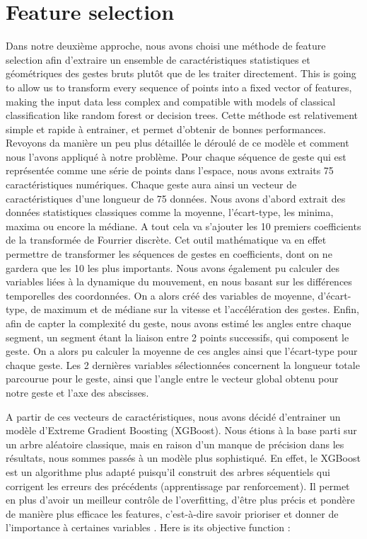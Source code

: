 \documentclass{article}
\begin{document}
\section{Feature selection}
Dans notre deuxième approche, nous avons choisi une méthode de feature selection afin d’extraire un ensemble de caractéristiques statistiques et géométriques des gestes bruts plutôt que de les traiter directement. 
This is going to allow us to transform every sequence of points into a fixed vector of features, making the input data less complex and compatible with models of classical classification like random forest or decision trees. 
Cette méthode est relativement simple et rapide à entrainer, et permet d’obtenir de bonnes performances. Revoyons da manière un peu plus détaillée le déroulé de ce modèle et comment nous l’avons appliqué à notre problème. 
Pour chaque séquence de geste qui est représentée comme une série de points dans l’espace, nous avons extraits 75 caractéristiques numériques. Chaque geste aura ainsi un vecteur de caractéristiques d’une longueur de 75 données. 
Nous avons d’abord extrait des données statistiques classiques comme la moyenne, l’écart-type, les minima, maxima ou encore la médiane.
A tout cela va s’ajouter les 10 premiers coefficients de la transformée de Fourrier discrète. Cet outil mathématique va en effet permettre de transformer les séquences de gestes en coefficients, dont on ne gardera que les 10 les plus importants. 
Nous avons également pu calculer des variables liées à la dynamique du mouvement, en nous basant sur les différences temporelles des coordonnées. On a alors créé des variables de moyenne, d’écart-type, de maximum et de médiane sur la vitesse et l’accélération des gestes. 
Enfin, afin de capter la complexité du geste, nous avons estimé les angles entre chaque segment, un segment étant la liaison entre 2 points successifs, qui composent le geste. On a alors pu calculer la moyenne de ces angles ainsi que l’écart-type pour chaque geste. Les 2 dernières variables sélectionnées concernent la longueur totale parcourue pour le geste, ainsi que l’angle entre le vecteur global obtenu pour notre geste et l’axe des abscisses. 

A partir de ces vecteurs de caractéristiques, 
nous avons décidé d’entrainer un modèle d’Extreme Gradient Boosting (XGBoost). 
Nous étions à la base parti sur un arbre aléatoire classique, 
mais en raison d’un manque de précision dans les résultats, 
nous sommes passés à un modèle plus sophistiqué. 
En effet, le XGBoost est un algorithme plus adapté 
puisqu’il construit des arbres séquentiels 
qui corrigent les erreurs des précédents (apprentissage par renforcement). 
Il permet en plus d’avoir un meilleur contrôle de l’overfitting, 
d’être plus précis et pondère de manière plus efficace les features, 
c'est-à-dire savoir prioriser et donner de l’importance à certaines variables \cite{chen2016}. 
Here is its objective function :
\end{document}
